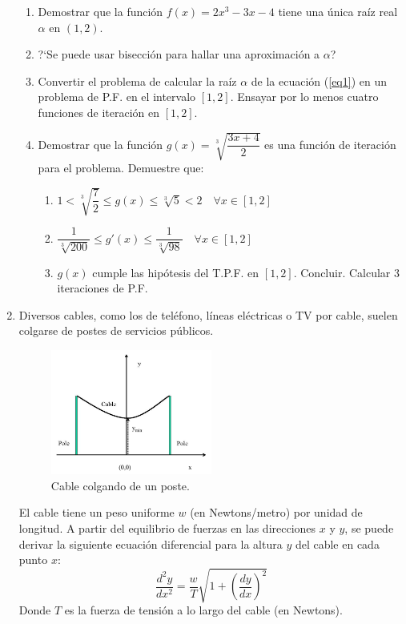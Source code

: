 \documentclass[12pt,letterpaper]{article}
\begin{document}
\begin{enumerate}
\begin{enumerate}
 \item Demostrar que la funci\'on $f(x) = 2x^3 - 3x - 4$ tiene una \'unica ra\'iz real $\alpha$ en $(1,2)$.
 \item ?`Se puede usar bisecci\'on para hallar una aproximaci\'on a $\alpha$?
 \item Convertir el problema de calcular la ra\'iz $\alpha$ de la ecuaci\'on (\ref{eq1}) en un problema de P.F. en el intervalo $[1,2]$. Ensayar por lo menos cuatro funciones de iteraci\'on en $[1,2]$.
 \item Demostrar que la funci\'on  $g(x) = \sqrt[3]{\dfrac{3x+4}{2}}$  es una funci\'on de iteraci\'on para el problema. Demuestre que:
 \begin{enumerate}
  \item $1 < \sqrt[3]{\dfrac{7}{2}}\leq g(x) \leq \sqrt[3]{5} < 2 \quad \forall x \in [1,2]$
  \item $\dfrac{1}{\sqrt[3]{200}} \leq g'(x) \leq \dfrac{1}{\sqrt[3]{98}} \quad \forall x \in [1,2]$
  \item $g(x)$ cumple las hip\'otesis del T.P.F. en $[1,2]$. Concluir. Calcular 3 iteraciones de P.F.
 \end{enumerate}
\end{enumerate}
\item Diversos cables, como los de tel\'efono, l\'ineas el\'ectricas o TV por cable, suelen colgarse de postes de servicios p\'ublicos.
\begin{figure}[!h]
    \centering
    \includegraphics[width=0.5\textwidth]{Screenshot_219.png}
    \caption{Cable colgando de un poste.}
\end{figure}
El cable tiene un peso uniforme $w$ (en Newtons/metro) por unidad de longitud. A partir del equilibrio de fuerzas en las direcciones 
$x$ y $y$, se puede derivar la siguiente ecuaci\'on diferencial para la altura 
$y$ del cable en cada punto $x$:
$$
\dfrac{d^2y}{dx^2} = \dfrac{w}{T}\sqrt{1+\left(\dfrac{dy}{dx}\right)^2}
$$
Donde $T$ es la fuerza de tensi\'on a lo largo del cable (en Newtons).


\end{enumerate}
\end{document}
